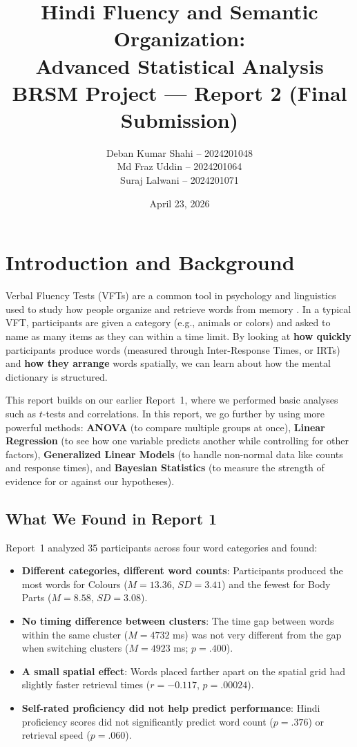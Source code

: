 \documentclass[12pt, a4paper]{article}
\title{\textbf{Hindi Fluency and Semantic Organization: \\Advanced Statistical Analysis} \\ \vspace{0.3cm} \large BRSM Project --- Report 2 (Final Submission)}
\author{
    Deban Kumar Shahi -- 2024201048 \\
    Md Fraz Uddin -- 2024201064 \\
    Suraj Lalwani -- 2024201071
}
\date{April 23, 2026}
\begin{document}
\maketitle

\section{Introduction and Background}

Verbal Fluency Tests (VFTs) are a common tool in psychology and linguistics used to study how people organize and retrieve words from memory \citep{lezak2012neuropsychological}. In a typical VFT, participants are given a category (e.g., animals or colors) and asked to name as many items as they can within a time limit. By looking at \textbf{how quickly} participants produce words (measured through Inter-Response Times, or IRTs) and \textbf{how they arrange} words spatially, we can learn about how the mental dictionary is structured.

This report builds on our earlier Report~1, where we performed basic analyses such as $t$-tests and correlations. In this report, we go further by using more powerful methods: \textbf{ANOVA} (to compare multiple groups at once), \textbf{Linear Regression} (to see how one variable predicts another while controlling for other factors), \textbf{Generalized Linear Models} (to handle non-normal data like counts and response times), and \textbf{Bayesian Statistics} (to measure the strength of evidence for or against our hypotheses).

\subsection{What We Found in Report 1}

Report~1 analyzed 35 participants across four word categories and found:
\begin{itemize}[nosep]
    \item \textbf{Different categories, different word counts}: Participants produced the most words for Colours ($M = 13.36$, $SD = 3.41$) and the fewest for Body Parts ($M = 8.58$, $SD = 3.08$).
    \item \textbf{No timing difference between clusters}: The time gap between words within the same cluster ($M = 4732$ ms) was not very different from the gap when switching clusters ($M = 4923$ ms; $p = .400$).
    \item \textbf{A small spatial effect}: Words placed farther apart on the spatial grid had slightly faster retrieval times ($r = -0.117$, $p = .00024$).
    \item \textbf{Self-rated proficiency did not help predict performance}: Hindi proficiency scores did not significantly predict word count ($p = .376$) or retrieval speed ($p = .060$).
\end{itemize}
\end{document}
